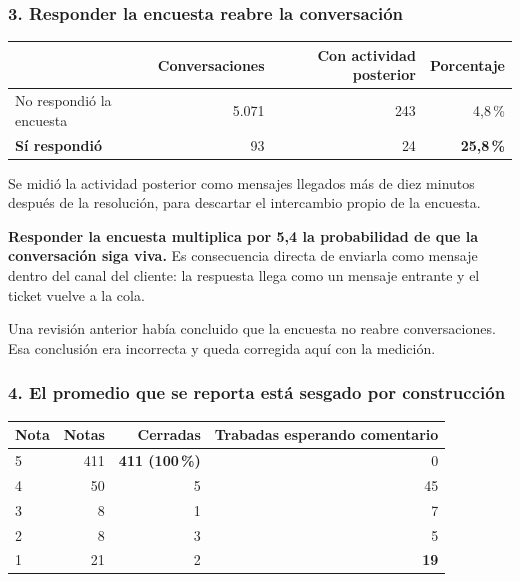 \documentclass[11pt,a4paper]{article}
\begin{document}
\subsubsection*{3. Responder la encuesta reabre la conversación}

\begin{center}
\begin{tabularx}{\textwidth}{@{}Lrrr@{}}
\toprule
& \textbf{Conversaciones} & \textbf{Con actividad posterior} & \textbf{Porcentaje} \\
\midrule
No respondió la encuesta & 5.071 & 243 & 4,8\,\% \\
\textbf{Sí respondió}    & 93    & 24  & \textbf{25,8\,\%} \\
\bottomrule
\end{tabularx}
\end{center}

Se midió la actividad posterior como mensajes llegados más de diez minutos después de la
resolución, para descartar el intercambio propio de la encuesta.

\begin{alerta}
\textbf{Responder la encuesta multiplica por 5,4 la probabilidad de que la conversación
siga viva.} Es consecuencia directa de enviarla como mensaje dentro del canal del
cliente: la respuesta llega como un mensaje entrante y el ticket vuelve a la cola.

\vspace{0.4em}
Una revisión anterior había concluido que la encuesta no reabre conversaciones. Esa
conclusión era incorrecta y queda corregida aquí con la medición.
\end{alerta}

\subsubsection*{4. El promedio que se reporta está sesgado por construcción}

\begin{center}
\begin{tabular}{@{}lrrr@{}}
\toprule
\textbf{Nota} & \textbf{Notas} & \textbf{Cerradas} & \textbf{Trabadas esperando comentario} \\
\midrule
5 & 411 & \textbf{411 (100\,\%)} & 0 \\
4 & 50  & 5  & 45 \\
3 & 8   & 1  & 7 \\
2 & 8   & 3  & 5 \\
1 & 21  & 2  & \textbf{19} \\
\bottomrule
\end{tabular}
\end{center}
\end{document}
